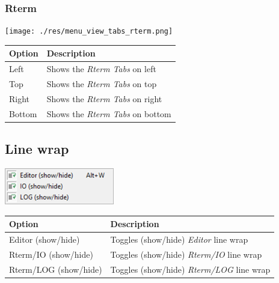 \hypertarget{menu_view_tabs_rterm}{}
\subsubsection{Rterm}

\texttt{[image: ./res/menu\_view\_tabs\_rterm.png]}\\

\begin{scriptsize}
  \begin{tabularx}{\textwidth}{>{\hsize=0.3\hsize}X>{\hsize=0.7\hsize}X}\\
    \hline
    \textbf{Option} & \textbf{Description} \\
    \hline
    Left & Shows the \textit{Rterm Tabs} on left \\
    Top & Shows the \textit{Rterm Tabs} on top \\
    Right & Shows the \textit{Rterm Tabs} on right \\
    Bottom & Shows the \textit{Rterm Tabs} on bottom \\
    \hline
  \end{tabularx}
\end{scriptsize}


\hypertarget{menu_view_linewrap}{}
\subsection{Line wrap}

\includegraphics[scale=0.50]{./res/menu_view_linewrap.png}\\

\begin{scriptsize}
  \begin{tabularx}{\textwidth}{>{\hsize=0.3\hsize}X>{\hsize=0.7\hsize}X}\\
    \hline
    \textbf{Option} & \textbf{Description} \\
    \hline
    Editor (show/hide) & Toggles (show/hide) \textit{Editor} line wrap \\
    Rterm/IO (show/hide) & Toggles (show/hide) \textit{Rterm/IO} line wrap \\
    Rterm/LOG (show/hide) & Toggles (show/hide) \textit{Rterm/LOG} line wrap \\
    \hline
  \end{tabularx}
\end{scriptsize}


